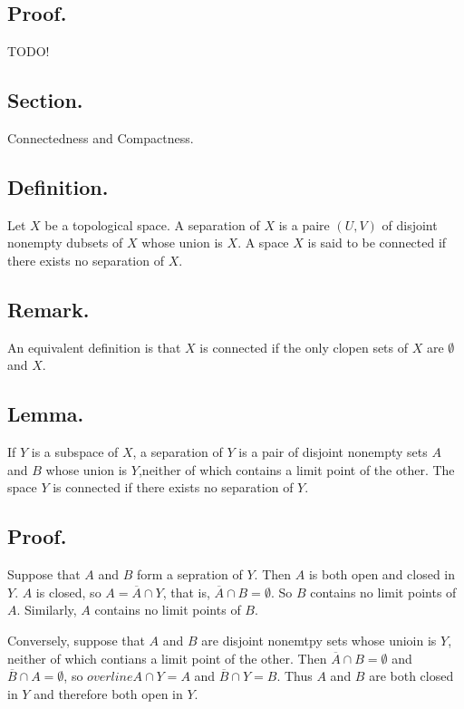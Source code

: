 \documentclass[titlepage]{article}
\begin{document}
\subsection{Proof.} TODO!

\newpage {}

\subsection{Section.} Connectedness and Compactness.

\subsection{Definition.} Let $X$ be a topological space. A separation of $X$ is a paire $(U, V)$ of disjoint nonempty dubsets of $X$ whose union is $X$. A space $X$ is said to be connected if there exists no separation of $X$.

\subsection{Remark.} An equivalent definition is that $X$ is connected if the only clopen sets of $X$ are $\emptyset$ and $X$.

\subsection{Lemma.} If $Y$ is a subspace of $X$, a separation of $Y$ is a pair of disjoint nonempty sets $A$ and $B$ whose union is $Y$,neither of which contains a limit point of the other. The space $Y$ is connected if there exists no separation of $Y$.

\subsection{Proof.} Suppose that $A$ and $B$ form a sepration of $Y$. Then $A$ is both open and closed in $Y$. $A$ is closed, so $A = \overline{A} \cap Y$, that is, $\overline{A} \cap B = \emptyset$. So $B$ contains no limit points of $A$. Similarly, $A$ contains no limit points of $B$.

Conversely, suppose that $A$ and $B$ are disjoint nonemtpy sets whose unioin is $Y$, neither of which contians a limit point of the other. Then $\overline{A} \cap B = \emptyset$ and $\overline{B} \cap A = \emptyset$, so $overline{A} \cap Y = A$ and $\overline{B} \cap Y = B$. Thus $A$ and $B$ are both closed in $Y$ and therefore both open in $Y$.
\end{document}
